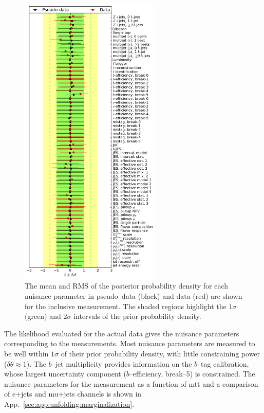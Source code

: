 \documentclass[a4paper]{article}
\begin{document}
\begin{figure}[!htb]\centering
\includegraphics[width=0.6\textwidth]{nuispar}
\caption{The mean and RMS of the posterior probability density for
each nuisance parameter in pseudo--data (black) and data
(red) are shown for the inclusive \AC{} measurement. The
shaded regions highlight the $1\sigma$ (green) and $2\sigma$
intervals of the prior probability density.}
\label{fig:nuispar}
\end{figure}
The likelihood evaluated for the actual data gives the nuisance
parameters corresponding to the measurements.
Most nuisance parameters are measured to be well within $1\sigma$ of
their prior probability density, with little constraining power
($\delta\theta\approx1$). The $b$--jet multiplicity provides
information on the $b$--tag calibration, whose largest uncertainty
component ($b$--efficiency, break--5) is constrained. The nuisance
parameters for the measurement as a function of mtt and a
comparison of e+jets and mu+jets channels is shown in
App.~\ref{sec:app:unfolding:marginalization}.
\end{document}
